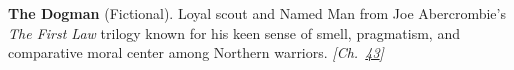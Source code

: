\textbf{The Dogman} (Fictional). Loyal scout and Named Man from Joe Abercrombie's \emph{The First Law} trilogy known for his keen sense of smell, pragmatism, and comparative moral center among Northern warriors. \emph{[Ch.~\hyperref[ch:nearflatuniverse]{43}]}

